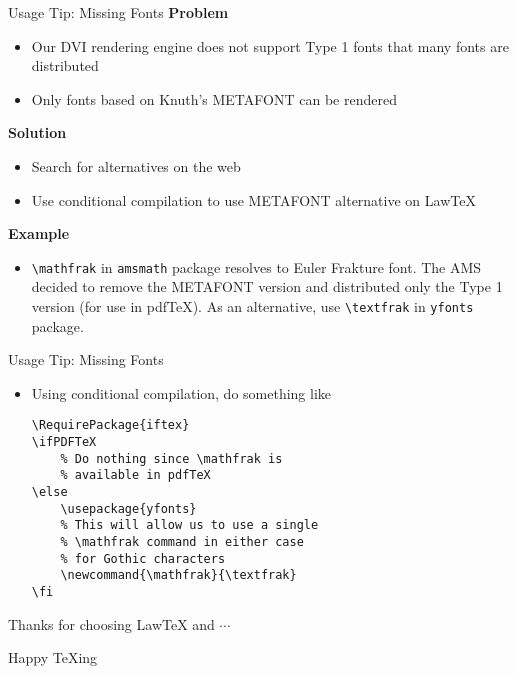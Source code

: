 \documentclass{beamer}
\begin{document}
\begin{frame}{Usage Tip: Missing Fonts}
\textbf{Problem}
\begin{itemize}
\item Our DVI rendering engine does not support Type 1 fonts that many fonts are distributed
\item Only fonts based on Knuth's METAFONT can be rendered
\end{itemize}
\textbf{Solution}
\begin{itemize}
\item Search for alternatives on the web
\item Use conditional compilation to use METAFONT alternative on LawTeX
\end{itemize}
\textbf{Example}
\begin{itemize}
\item \texttt{\textbackslash mathfrak} in \texttt{amsmath} package resolves to Euler Frakture font. The AMS decided to remove the METAFONT version and distributed only the Type 1 version (for use in pdfTeX). As an alternative, use \texttt{\textbackslash textfrak} in \texttt{yfonts} package.
\end{itemize}
\end{frame}

\begin{frame}[fragile]{Usage Tip: Missing Fonts}
\begin{itemize}
\item Using conditional compilation, do something like
\begin{lstlisting}
\RequirePackage{iftex}
\ifPDFTeX
    % Do nothing since \mathfrak is
    % available in pdfTeX
\else
    \usepackage{yfonts}
    % This will allow us to use a single
    % \mathfrak command in either case
    % for Gothic characters
    \newcommand{\mathfrak}{\textfrak}
\fi
\end{lstlisting}
\end{itemize}
\end{frame}

\begin{frame}{Thanks for choosing LawTeX and $\cdots$}
\begin{center}
\Huge Happy \TeX ing
\end{center}
\end{frame}
\end{document}

